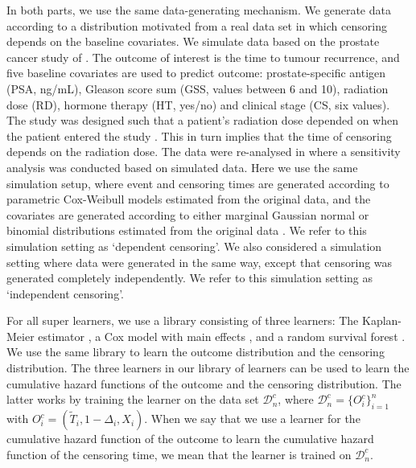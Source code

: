\documentclass[lineno]{biometrika}
\newcommand{\1}{\mathds{1}}
\newcommand{\data}{\ensuremath{\mathcal{D}}}
\begin{document}
In both parts, we use the same data-generating mechanism. We generate data
according to a distribution motivated from a real data set in which censoring
depends on the baseline covariates. We simulate data based on the prostate
cancer study of \cite{kattan2000pretreatment}. The outcome of interest is the
time to tumour recurrence, and five baseline covariates are used to predict
outcome: prostate-specific antigen (PSA, ng/mL), Gleason score sum (GSS, values
between 6 and 10), radiation dose (RD), hormone therapy (HT, yes/no) and
clinical stage (CS, six values). The study was designed such that a patient's
radiation dose depended on when the patient entered the study
\citep{gerds2013estimating}. This in turn implies that the time of censoring
depends on the radiation dose. The data were re-analysed in
\citep{gerds2013estimating} where a sensitivity analysis was conducted based on
simulated data. Here we use the same simulation setup, where event and censoring
times are generated according to parametric Cox-Weibull models estimated from
the original data, and the covariates are generated according to either marginal
Gaussian normal or binomial distributions estimated from the original data
\citep[c.f.,][Section~4.6]{gerds2013estimating}. We refer to this simulation
setting as `dependent censoring'. We also considered a simulation setting where
data were generated in the same way, except that censoring was generated
completely independently. We refer to this simulation setting as `independent
censoring'.

For all super learners, we use a library consisting of three
learners: The Kaplan-Meier estimator
\citep{kaplan1958nonparametric,Gerds_2019prodlim}, a Cox model
with main effects \citep{cox1972regression, survival-package},
and a random survival forest
\citep{ishwaran2008random,randomForestSRC}. We use the same
library to learn the outcome distribution and the censoring
distribution. The three learners in our library of
learners can be used to learn the cumulative hazard functions
of the outcome and the censoring distribution. The latter
works by training the learner on the data set \( \data_n^c \),
where \( \data_n^c = \{O_i^c\}_{i=1}^n \) with
\( O_i^c = (\tilde{T}_i, 1-\Delta_i, X_i) \). When we say that
we use a learner for the cumulative hazard function of the
outcome to learn the cumulative hazard function of the
censoring time, we mean that the learner is trained on
\( \data_n^c \).
\end{document}
